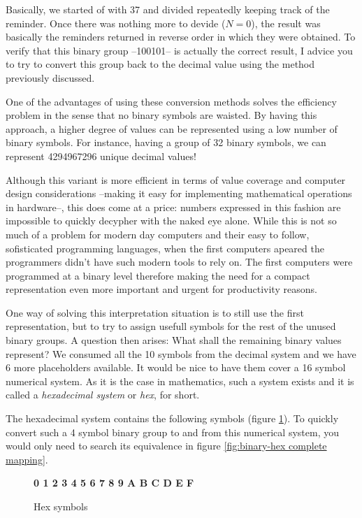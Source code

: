 \documentclass[12pt, a4paper]{book}
\begin{document}
Basically, we started of with 37 and divided repeatedly keeping track of the reminder. Once there was nothing more to devide ($N=0$), the result was basically the reminders returned in reverse order in which they were obtained. To verify that this binary group --100101-- is actually the correct result, I advice you to try to convert this group back to the decimal value using the method previously discussed.

One of the advantages of using these conversion methods solves the efficiency problem in the sense that no binary symbols are waisted. By having this approach, a higher degree of values can be represented using a low number of binary symbols. For instance, having a group of 32 binary symbols, we can represent 4294967296 unique decimal values!

Although this variant is more efficient in terms of value coverage and computer design considerations --making it easy for implementing mathematical operations in hardware--, this does come at a price: numbers expressed in this fashion are impossible to quickly decypher with the naked eye alone. While this is not so much of a problem for modern day computers and their easy to follow, sofisticated programming languages, when the first computers apeared the programmers didn't have such modern tools to rely on. The first computers were programmed at a binary level therefore making the need for a compact representation even more important and urgent for productivity reasons.

One way of solving this interpretation situation is to still use the first representation, but to try to assign usefull symbols for the rest of the unused binary groups. A question then arises: What shall the remaining binary values represent? We consumed all the 10 symbols from the decimal system and we have 6 more placeholders available. It would be nice to have them cover a 16 symbol numerical system. As it is the case in mathematics, such a system exists and it is called a \textit{hexadecimal system} or \textit{hex}, for short.

The hexadecimal system contains the following symbols (figure \ref{fig:hex symbols}). To quickly convert such a 4 symbol binary group to and from this numerical system, you would only need to search its equivalence in figure \ref{fig:binary-hex complete mapping}. 

\begin{figure}[h]
  \centering
  \huge
  \textbf{0 1 2 3 4 5 6 7 8 9 A B C D E F}
  \caption{Hex symbols}
  \label{fig:hex symbols}
\end{figure}
\end{document}

